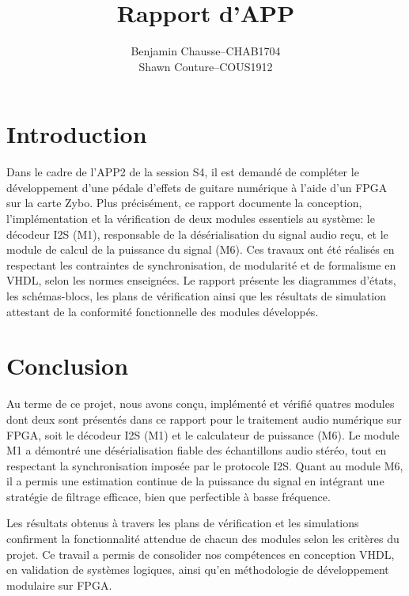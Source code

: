 \documentclass[a11paper]{article}
\title{Rapport d'APP}
\author{
  \addtolength{\tabcolsep}{-0.4em}
  \begin{tabular}{rcl} %
      Benjamin Chausse & -- & CHAB1704 \\
      Shawn Couture    & -- & COUS1912 \\
  \end{tabular}
}
\newcommand{\note}[1]{\begin{color}{Orange}\textbf{NOTE:} #1\end{color}}
\begin{document}
\maketitle
\newpage
\tableofcontents
\listoffigures
\listoftables
\newpage


\section{Introduction}

Dans le cadre de l'APP2 de la session S4, il est demandé de compléter le
développement d'une pédale d'effets de guitare numérique à l'aide d'un FPGA
sur la carte Zybo. Plus précisément, ce rapport documente la conception,
l'implémentation et la vérification de deux modules essentiels au système:
le décodeur I2S (M1), responsable de la désérialisation du signal audio reçu,
et le module de calcul de la puissance du signal (M6). Ces travaux ont été
réalisés en respectant les contraintes de synchronisation, de modularité et
de formalisme en VHDL, selon les normes enseignées. Le rapport présente les
diagrammes d'états, les schémas-blocs, les plans de vérification ainsi que
les résultats de simulation attestant de la conformité fonctionnelle des
modules développés.




\section{Conclusion}

Au terme de ce projet, nous avons conçu, implémenté et vérifié quatres modules dont deux sont présentés dans ce rapport pour le traitement audio numérique sur FPGA, soit le décodeur I2S (M1) et le calculateur de puissance (M6). Le module M1 a démontré une désérialisation fiable des échantillons audio stéréo, tout en respectant la synchronisation imposée par le protocole I2S. Quant au module M6, il a permis une estimation continue de la puissance du signal en intégrant une stratégie de filtrage efficace, bien que perfectible à basse fréquence.

Les résultats obtenus à travers les plans de vérification et les simulations confirment la fonctionnalité attendue de chacun des modules selon les critères du projet. Ce travail a permis de consolider nos compétences en conception VHDL, en validation de systèmes logiques, ainsi qu’en méthodologie de développement modulaire sur FPGA.
\end{document}
